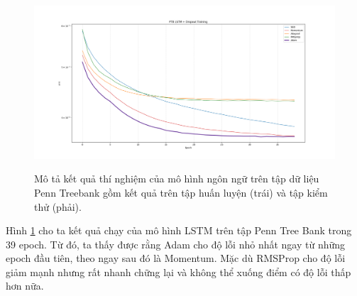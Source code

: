 \begin{figure}[htp]
	\centering
	\includegraphics[width=140 mm]{images/ptb.png}
	\label{fig:ptb}
	\caption{Mô tả kết quả thí nghiệm của mô hình ngôn ngữ trên tập dữ liệu Penn Treebank gồm kết quả trên tập huấn luyện (trái) và tập kiểm thử (phải).}
\end{figure}

Hình \ref{fig:ptb} cho ta kết quả chạy của mô hình LSTM trên tập Penn Tree Bank trong 39 epoch. Từ đó, ta thấy được rằng Adam cho độ lỗi nhỏ nhất ngay từ những epoch đầu tiên, theo ngay sau đó là Momentum. Mặc dù RMSProp cho độ lỗi giảm mạnh nhưng rất nhanh chững lại và không thể xuống điểm có độ lỗi thấp hơn nữa.